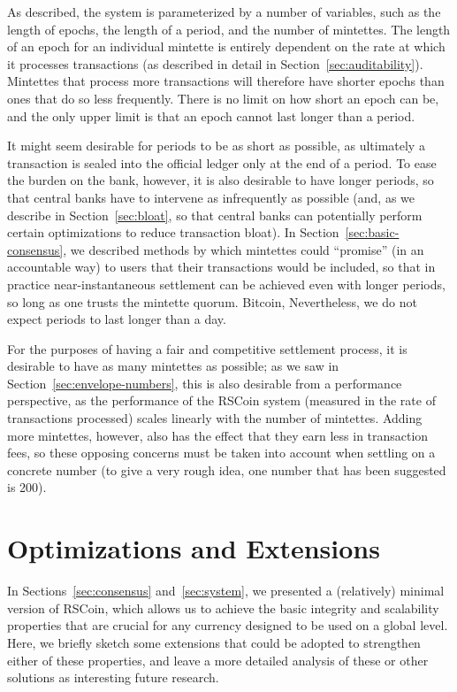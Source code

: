 \documentclass[conference]{IEEEtran}
\newcommand{\rscoin}{\textsf{RSCoin}\xspace}
\begin{document}
As described, the system is parameterized by a number of variables, such as
the length of epochs, the length of a period, and the number of
mintettes.
The length of an epoch for an individual mintette is entirely dependent on
the rate at which it processes transactions (as described in detail in
Section~\ref{sec:auditability}).  Mintettes that process more transactions
will therefore have shorter epochs than ones that do so less frequently.
There is no limit on how short an epoch can be, and the only
upper limit is that an epoch cannot last longer than a period.

It might seem desirable for periods to be as
short as possible, as ultimately a transaction is sealed into the official
ledger only at the end of a period.  To ease the burden on the bank, however,
it is also desirable to have longer periods, so that central banks have to
intervene as infrequently as possible (and, as we describe in
Section~\ref{sec:bloat}, so that central banks can potentially perform
certain optimizations to reduce transaction bloat).  In
Section~\ref{sec:basic-consensus}, we described
methods by which mintettes could ``promise'' (in an accountable way) to users
that their transactions would be included, so that in practice
near-instantaneous settlement can be achieved even with longer periods, so
long as one trusts the mintette quorum. Bitcoin,
Nevertheless, we do not expect periods to last longer than a day.

For the purposes of having a fair and competitive settlement process, it
is desirable to have as many mintettes as possible; as we saw in
Section~\ref{sec:envelope-numbers}, this is also desirable from a performance
perspective, as the performance of the \rscoin system
(measured in the rate of transactions processed) scales linearly with the
number of mintettes.  Adding more mintettes, however, also has the effect
that they earn less in transaction fees, so these opposing concerns must be
taken into account when settling on a concrete number (to give a very rough
idea, one number that has been suggested~\cite{boe-private} is 200).

\section{Optimizations and Extensions}\label{sec:extensions}

In Sections~\ref{sec:consensus} and~\ref{sec:system}, we presented a
(relatively) minimal version of \rscoin, which allows us to achieve the basic
integrity and scalability properties that are crucial for any currency
designed to be used on a global level.  Here, we briefly sketch some
extensions that could be adopted to strengthen either of these properties,
and leave a more detailed analysis of these or other solutions as interesting
future research.
\end{document}
